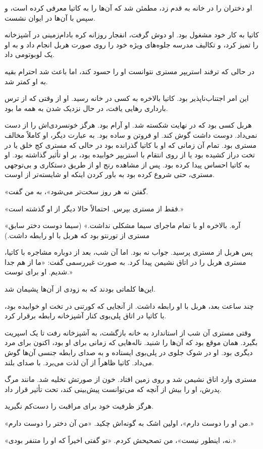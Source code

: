 
او دختران را در خانه به قدم زد، مطمئن شد که آن‌ها را به کاتیا معرفی کرده است، و سپس با آن‌ها در ایوان نشست.

کاتیا به کار خود مشغول بود. او دوش گرفت، انفجار روزانه کره بادام‌زمینی در آشپزخانه را تمیز کرد، و تکالیف مدرسه جلوه‌های ویژه خود را روی صورت هربل انجام داد و به او یک لوبوتومی داد.

در حالی که ترفند استریپر مستری نتوانست او را حسود کند، اما باعث شد احترام بقیه به او کمتر شد.

این امر اجتناب‌ناپذیر بود. کاتیا بالاخره به کسی در خانه رسید. او از وقتی که از ترس بارداری رهایی یافت، در حال نزدیک شدن به همه‌ ما بود.

هربل کسی بود که در نهایت شکسته شد. او آرام بود. هرگز خونسردی‌اش را از دست نمی‌داد. دوست داشت گوش کند. او فروتن و ساده بود. به عبارت دیگر، او کاملاً مخالف مستری بود. تمام آن زمانی که او با کاتیا گذرانده بود در حالی که مستری کج خلق یا در تخت دراز کشیده بود یا از روی انتقام با استریپر خوابیده بود، بر او تأثیر گذاشته بود. او به کاتیا احساس پیدا کرده بود. پس از مشاهده رنج او از طریق دستکاری و بی‌توجهی مستری، حتی شروع کرده بود به باور کردن اینکه او شایسته‌تر از اوست.

«گفتن نه هر روز سخت‌تر می‌شود»،‌ به من گفت.

«فقط از مستری بپرس. احتمالاً حالا دیگر از او گذشته است.»

«آره. بالاخره او با تمام ماجرای سیما مشکلی نداشت.» (سیما دوست دختر سابق مستری از تورنتو بود که هربل با او رابطه داشت.)

پس هربل از مستری پرسید. جواب نه بود. اما آن شب، بعد از دوباره مشاجره با کاتیا، مستری هربل را در اتاق نشیمن پیدا کرد. به صورت غیررسمی گفت: «ما از هم جدا شدیم. او برای توست.»

این‌ها کلماتی بودند که به زودی از آن‌ها پشیمان شد.

چند ساعت بعد، هربل با او رابطه داشت. از آنجایی که کورتنی در تخت او خوابیده بود، با کاتیا در اتاق پلی‌بوی کنار آشپزخانه رابطه برقرار کرد.

وقتی مستری آن شب از استاندارد به خانه بازگشت، به آشپزخانه رفت تا یک اسپریت بگیرد. همان موقع بود که آن‌ها را شنید. ناله‌هایی که زمانی برای او بود، اکنون برای مرد دیگری بود. او در شوک جلوی در پلی‌بوی ایستاده و به صدای رابطه جنسی آن‌ها گوش می‌داد. کاتیا ظاهراً از آن لذت می‌برد. با صدای بلند.

مستری وارد اتاق نشیمن شد و روی زمین افتاد. خون از صورتش تخلیه شد. مانند مرگ پدرش، او را بیش از آنچه که می‌توانست پیش‌بینی کند، تحت تأثیر قرار داد.

هرگز ظرفیت خود برای مراقبت را دست‌کم نگیرید.

«من او را دوست دارم»، اولین اشک به گونه‌اش چکید. «من آن دختر را دوست دارم.»

«نه، اینطور نیست»، من تصحیحش کردم. «تو گفتی اخیراً که او را متنفر بودی.»
